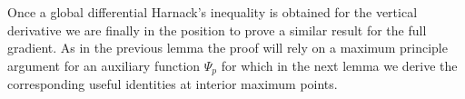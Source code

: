\documentclass[10pt]{amsart}
\numberwithin{equation}{section}
\theoremstyle{definition}
\newcommand{\eps}{\varepsilon}
\newcommand{\egrad}{\nabla_{\eps}}
\begin{document}

Once a global differential Harnack's inequality is obtained for the vertical derivative we are finally in the position to prove a similar result for the full gradient. As in the previous lemma the proof will rely on a maximum principle argument for an auxiliary function $\Psi_p$ for which in the next lemma we derive the corresponding useful identities at interior maximum points.
   
\end{document}
